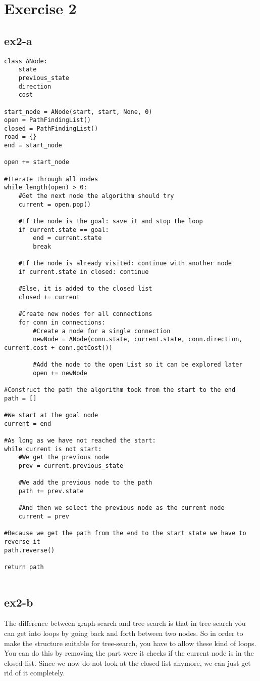 \section{Exercise 2}
\subsection{ex2-a}
\begin{lstlisting}
class ANode:
	state
	previous_state
	direction
	cost

start_node = ANode(start, start, None, 0)
open = PathFindingList()
closed = PathFindingList()
road = {}
end = start_node

open += start_node

#Iterate through all nodes
while length(open) > 0:
	#Get the next node the algorithm should try
	current = open.pop()
	
	#If the node is the goal: save it and stop the loop
	if current.state == goal: 
		end = current.state 
		break
	
	#If the node is already visited: continue with another node
	if current.state in closed: continue
	
	#Else, it is added to the closed list
	closed += current
	
	#Create new nodes for all connections
	for conn in connections:
		#Create a node for a single connection
		newNode = ANode(conn.state, current.state, conn.direction, current.cost + conn.getCost())
		
		#Add the node to the open List so it can be explored later
		open += newNode

#Construct the path the algorithm took from the start to the end
path = []

#We start at the goal node
current = end

#As long as we have not reached the start:
while current is not start:
	#We get the previous node
	prev = current.previous_state
	
	#We add the previous node to the path
	path += prev.state
	
	#And then we select the previous node as the current node
	current = prev
	
#Because we get the path from the end to the start state we have to reverse it
path.reverse()

return path


\end{lstlisting}

\subsection{ex2-b}
The difference between graph-search and tree-search is that in tree-search you can get into loops by 
going back and forth between two nodes. So in order to make the structure suitable for tree-search,
you have to allow these kind of loops. You can do this by removing the part were it checks if the 
current node is in the closed list. Since we now do not look at the closed list anymore, we can just
get rid of it completely.